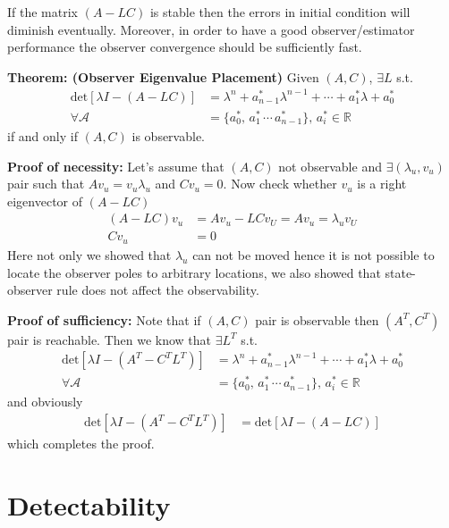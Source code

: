 \documentclass[twoside]{article}
\begin{document}
If the matrix $\left( A - L C \right)$ is stable then the errors in
initial condition will diminish eventually. Moreover, in order
to have a good observer/estimator performance the observer
convergence should be sufficiently fast. 

\textbf{Theorem: (Observer Eigenvalue Placement)} Given $(A,C)$, $\exists L$ s.t. 
%
\begin{align*}
	\mathrm{det}\left[ \lambda I - (A - L C ) \right] &= \lambda^n + a_{n-1}^*  \lambda^{n-1}
	+ \cdots + a_{1}^* \lambda + a_0^*
	\\
	\forall \mathcal{A} &= \lbrace a_0^* , \, a_1^* \, \cdots \, a_{n-1}^* \rbrace , \, a_i^* \in \mathbb{R}
\end{align*} 
%
if and only if $(A,C)$ is observable. 

\textbf{Proof of necessity: } Let's assume that $(A,C)$ not observable and $\exists (\lambda_u , v_u)$ pair such that
$A v_u = v_u \lambda_u $ and $C v_u = 0$. Now check whether $v_u$ is a right eigenvector of $(A - L C)$
%
\begin{align*}
	 (A - L C ) v_u &= A v_u - L C v_U = A v_u = \lambda_u v_U
	\\
        C v_u  &= 0
\end{align*} 
%
Here not only we showed that $\lambda_u$ can not be moved hence it is not possible to locate the observer poles to
arbitrary locations, we also showed that state-observer rule does not affect the observability.

\textbf{Proof of sufficiency:} Note that if $(A,C)$ pair is observable then $(A^T,C^T)$ pair is reachable. Then we know that 
$\exists L^T$ s.t. 
%
\begin{align*}
	\mathrm{det}\left[ \lambda I - (A^T - C^T L^T ) \right] &= \lambda^n + a_{n-1}^*  \lambda^{n-1}
	+ \cdots + a_{1}^* \lambda + a_0^* 
	\\
	\forall \mathcal{A} &= \lbrace a_0^* , \, a_1^* \, \cdots \, a_{n-1}^* \rbrace , \, a_i^* \in \mathbb{R}
\end{align*} 
%
and obviously 
%
\begin{align*}
	\mathrm{det}\left[ \lambda I - (A^T - C^T L^T ) \right] &= \mathrm{det}\left[ \lambda I - (A - L C ) \right] 
\end{align*} 
%
which completes the proof.

\section{Detectability}
\end{document}
